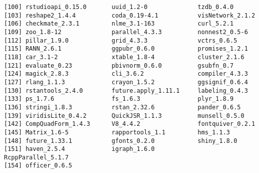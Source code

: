 \documentclass[
  letterpaper,
  DIV=11,
  numbers=noendperiod]{scrartcl}
\begin{document}
\begin{verbatim}
[100] rstudioapi_0.15.0       uuid_1.2-0              tzdb_0.4.0             
[103] reshape2_1.4.4          coda_0.19-4.1           visNetwork_2.1.2       
[106] checkmate_2.3.1         nlme_3.1-163            curl_5.2.1             
[109] zoo_1.8-12              parallel_4.3.3          nonnest2_0.5-6         
[112] pillar_1.9.0            grid_4.3.3              vctrs_0.6.5            
[115] RANN_2.6.1              ggpubr_0.6.0            promises_1.2.1         
[118] car_3.1-2               xtable_1.8-4            cluster_2.1.6          
[121] evaluate_0.23           pbivnorm_0.6.0          gsubfn_0.7             
[124] magick_2.8.3            cli_3.6.2               compiler_4.3.3         
[127] rlang_1.1.3             crayon_1.5.2            ggsignif_0.6.4         
[130] rstantools_2.4.0        future.apply_1.11.1     labeling_0.4.3         
[133] ps_1.7.6                fs_1.6.3                plyr_1.8.9             
[136] stringi_1.8.3           rstan_2.32.6            pander_0.6.5           
[139] viridisLite_0.4.2       QuickJSR_1.1.3          munsell_0.5.0          
[142] CompQuadForm_1.4.3      V8_4.4.2                fontquiver_0.2.1       
[145] Matrix_1.6-5            rapportools_1.1         hms_1.1.3              
[148] future_1.33.1           gfonts_0.2.0            shiny_1.8.0            
[151] haven_2.5.4             igraph_1.6.0            RcppParallel_5.1.7     
[154] officer_0.6.5          
\end{verbatim}
\end{document}
